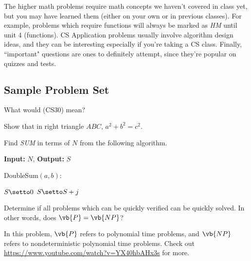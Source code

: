 \documentclass[11pt]{article}
\newcommand{\important}{$\blacktriangleright\,$}
\begin{document}
The higher math problems require math concepts we haven't covered in class yet, but you may have learned them (either on your own or in previous classes). For example, problems which require functions will always be marked as \textit{HM} until unit 4 (functions). CS Application problems usually involve algorithm design ideas, and they can be interesting especially if you're taking a CS class. Finally, ``important" questions are ones to definitely attempt, since they're popular on quizzes and tests.

\subsection*{Sample Problem Set}

\begin{problem}[\important 00]
    What would (CS30) mean?
\end{problem}
\begin{problem}[10]
    Show that in right triangle $ABC$, $a^2 + b^2 = c^2$.
\end{problem}
\begin{problem}[CS15]
    Find \textit{SUM} in terms of $N$ from the following algorithm.
    \begin{algo}
    \textbf{Input:} $N$, \textbf{Output:} $S$
    \begin{algorithm}[H]
    	DoubleSum$(a,b)$:
    	
    	$S \setto 0$
      	{
		  	{
		    	$S \setto S + j$
		  	}
      	}
	\end{algorithm}
	\end{algo}
\end{problem}
\begin{problem}[HM/CS50]
    Determine if all problems which can be quickly verified can be quickly solved. In other words, does $\vb{P} = \vb{NP}$?
\end{problem}
\begin{remark}
    In this problem, $\vb{P}$ refers to polynomial time problems, and $\vb{NP}$ refers to nondeterministic polynomial time problems. Check out \url{https://www.youtube.com/watch?v=YX40hbAHx3s} for more.
\end{remark}

\begin{center}
    
\end{center}

\newpage
\end{document}

